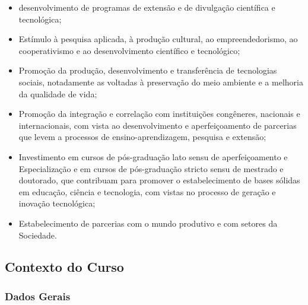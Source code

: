 \begin{itemize}
\item desenvolvimento de programas de extensão e de divulgação científica e tecnológica;

\item Est\'imulo \`a pesquisa aplicada, \`a produção cultural, ao empreendedorismo, ao cooperativismo e ao desenvolvimento científico e tecnológico;

\item Promo\c{c}\~ao da produção, desenvolvimento e transferência de tecnologias sociais, notadamente as voltadas à preservação do meio ambiente e a melhoria da qualidade de vida;

\item Promo\c{c}\~ao da integração e correlação com instituições congêneres, nacionais e internacionais, com vista ao desenvolvimento e aperfeiçoamento de parcerias que levem a processos de ensino-aprendizagem, pesquisa e extensão;

\item Investimento em cursos de pós-graduação lato sensu de aperfeiçoamento e Especialização e em cursos de pós-graduação stricto sensu de mestrado e doutorado, que contribuam para promover o estabelecimento de bases sólidas em educação, ciência e tecnologia, com vistas no processo de geração e inovação tecnológica;

\item Estabelecimento de parcerias com o mundo produtivo e com setores da Sociedade. 

\end{itemize}

\subsection{Contexto do Curso}


\subsubsection{Dados Gerais}

